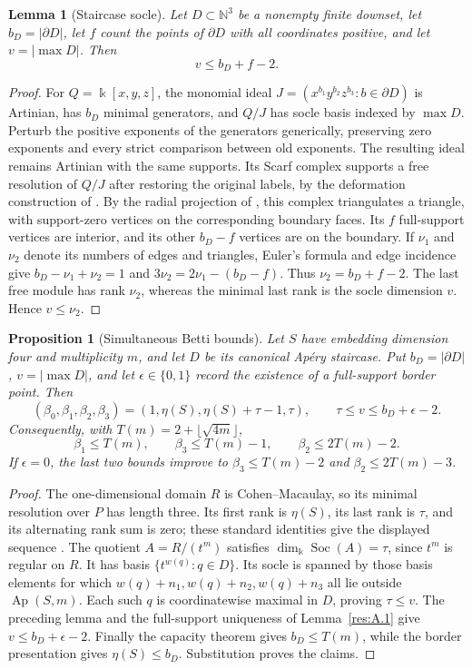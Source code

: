 \documentclass[11pt]{article}
\newtheorem{lemma}[theorem]{Lemma}
\newtheorem{proposition}[theorem]{Proposition}
\theoremstyle{definition}
\theoremstyle{remark}
\theoremstyle{plain}
\begin{document}
\begin{lemma}[Staircase socle]\label{lem:socle}
Let $D\subset\mathbb N^3$ be a nonempty finite downset, let
$b_D=|\partial D|$, let $f$ count the points of $\partial D$ with all
coordinates positive, and let $v=|\max D|$.  Then
\[
v\le b_D+f-2.
\]\end{lemma}
\begin{proof}
For $Q=\Bbbk[x,y,z]$, the monomial ideal
$J=(x^{b_1}y^{b_2}z^{b_3}:b\in\partial D)$ is Artinian, has $b_D$ minimal
generators, and $Q/J$ has socle basis indexed by $\max D$.
Perturb the positive exponents of the generators generically, preserving
zero exponents and every strict comparison between old exponents.
The resulting ideal remains Artinian with the same supports.  Its Scarf
complex supports a free resolution of $Q/J$ after restoring the original
labels, by the deformation construction of
\cite[Theorem~4.3 and Corollary~4.4]{BPS98}.
By the radial projection of \cite[Construction~5.4 and Corollary~5.5]{BPS98}, this complex triangulates a triangle, with support-zero vertices on the corresponding boundary faces.
Its $f$ full-support vertices are interior, and its other $b_D-f$ vertices
are on the boundary.  If $\nu_1$ and $\nu_2$ denote its numbers of edges and
triangles, Euler's formula and edge incidence give
$b_D-\nu_1+\nu_2=1$ and $3\nu_2=2\nu_1-(b_D-f)$.  Thus $\nu_2=b_D+f-2$.
The last free module has rank $\nu_2$, whereas the minimal last rank is the
socle dimension $v$.  Hence $v\le \nu_2$. \end{proof}

\medskip
\begin{proposition}[Simultaneous Betti bounds]\label{prop:betti}
Let $S$ have embedding dimension four and multiplicity $m$, and let
$D$ be its canonical Ap\'ery staircase.  Put $b_D=|\partial D|$,
$v=|\max D|$, and let $\epsilon\in\{0,1\}$ record the existence of a
full-support border point.  Then
\[
(\beta_0,\beta_1,\beta_2,\beta_3)
 = (1,\eta(S),\eta(S)+\tau-1,\tau),
\qquad
\tau\le v\le b_D+\epsilon-2.
\]
Consequently, with $T(m)=2+\lfloor\sqrt{4m}\rfloor$,
\[
\beta_1\le T(m),\qquad
\beta_3\le T(m)-1,\qquad
\beta_2\le 2T(m)-2.
\]
If $\epsilon=0$, the last two bounds improve to
$\beta_3\le T(m)-2$ and $\beta_2\le2T(m)-3$.\end{proposition}

\begin{proof}
The one-dimensional domain $R$ is Cohen--Macaulay, so its minimal
resolution over $P$ has length three.  Its first rank is $\eta(S)$,
its last rank is $\tau$, and its alternating rank sum is zero; these
standard identities give the displayed sequence
\cite[Section~1]{MSSurvey25}.
The quotient $A=R/(t^m)$ satisfies $\dim_{\Bbbk}\operatorname{Soc}(A)=\tau$, since $t^m$ is regular on $R$. It has basis
$\{t^{w(q)}:q\in D\}$.
Its socle is spanned by those basis elements for which
$w(q)+n_1,w(q)+n_2,w(q)+n_3$ all lie outside $\operatorname{Ap}(S,m)$.
Each such $q$ is coordinatewise maximal in $D$, proving $\tau\le v$.
The preceding lemma and the full-support uniqueness of Lemma~\ref{res:A.1} give
$v\le b_D+\epsilon-2$.  Finally the capacity theorem gives $b_D\le T(m)$,
while the border presentation gives $\eta(S)\le b_D$.
Substitution proves the claims. \end{proof}
\end{document}
